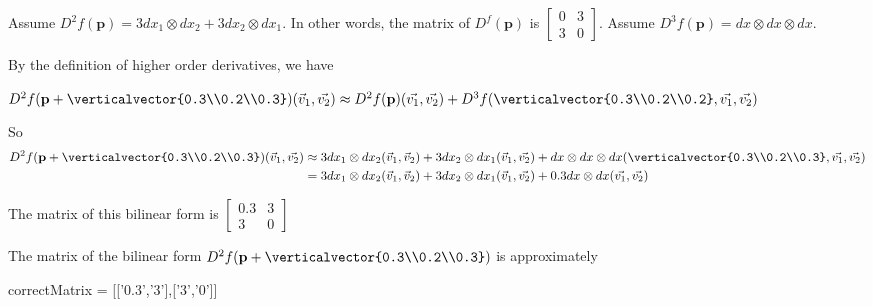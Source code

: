\documentclass{ximera}
\begin{document}
\begin{question}
	Assume \(D^2f(\mathbf{p}) = 3dx_1\otimes dx_2 + 3dx_2 \otimes dx_1\).  In other words, the matrix of $D^f(\mathbf{p})$ is 
	\(\begin{bmatrix} 0 & 3\\ 3&0 \end{bmatrix}\).  Assume $D^3f(\mathbf{p}) = dx \otimes dx \otimes dx$.
	\begin{solution}
		\begin{hint}
			By the definition of higher order derivatives, we have
			
			\(
				D^2f(\mathbf{p}+\verticalvector{0.3\\0.2\\0.3})(\vec{v}_1,\vec{v_2}) \approx D^2f(\mathbf{p})(\vec{v_1},\vec{v_2}) + D^3f(\verticalvector{0.3\\0.2\\0.2},\vec{v_1},\vec{v_2})
			\)
			
			
		\end{hint}
		\begin{hint}
			So 
			\begin{align*}
			D^2f(\mathbf{p}+\verticalvector{0.3\\0.2\\0.3})(\vec{v}_1,\vec{v_2}) &\approx 
				3dx_1\otimes dx_2(\vec{v}_1,\vec{v}_2) + 3dx_2 \otimes dx_1 (\vec{v}_1,\vec{v_2}) + dx \otimes dx \otimes dx (\verticalvector{0.3\\0.2\\0.3},\vec{v_1},\vec{v_2})\\
					&=3dx_1\otimes dx_2(\vec{v}_1,\vec{v}_2) + 3dx_2 \otimes dx_1 (\vec{v}_1,\vec{v_2})  + 0.3 dx \otimes dx (\vec{v_1},\vec{v_2})
			\end{align*}
		\end{hint}
	\begin{hint}
		The matrix of this bilinear form is \(\begin{bmatrix} 0.3 & 3\\3&0\end{bmatrix}\)
	\end{hint}
		The matrix of the bilinear form $D^2f(\mathbf{p}+\verticalvector{0.3\\0.2\\0.3})$ is approximately
		\begin{matrix-answer}
			correctMatrix = [['0.3','3'],['3','0']]
		\end{matrix-answer}
	\end{solution}
\end{question}
\end{document}
